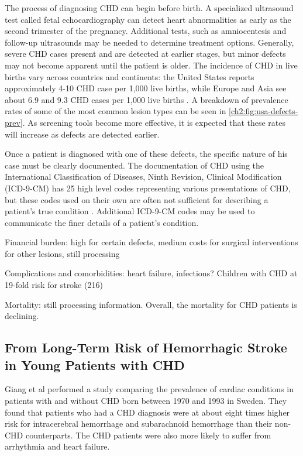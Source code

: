 The process of diagnosing CHD can begin before birth. A specialized ultrasound test called fetal echocardiography can detect heart abnormalities as early as the second trimester of the pregnancy. Additional tests, such as amniocentesis and follow-up ultrasounds may be needed to determine treatment options. Generally, severe CHD cases present and are detected at earlier stages, but minor defects may not become apparent until the patient is older. 
The incidence of CHD in live births vary across countries and continents: the United States reports approximately 4-10 CHD case per 1,000 live births, while Europe and Asia see about 6.9 and 9.3 CHD cases per 1,000 live births \cite{Mozaffarian2016}.
A breakdown of prevalence rates of some of the most common lesion types can be seen in \ref{ch2:fig:usa-defects-prev}.
As screening tools become more effective, it is expected that these rates will increase as defects are detected earlier. %

Once a patient is diagnosed with one of these defects, the specific nature of his case must be clearly documented. The documentation of CHD using the International Classification of Diseases, Ninth Revision, Clinical Modification (ICD-9-CM) has 25 high level codes representing various presentations of CHD, but these codes used on their own are often not sufficient for describing a patient's true condition \cite{Mozaffarian2016}. Additional ICD-9-CM codes may be used to communicate the finer details of a patient's condition. 


Financial burden: high for certain defects, medium costs for surgical interventions for other lesions, still processing \cite{Mozaffarian2016}

Complications and comorbidities: heart failure, infections? Children with CHD at 19-fold risk for stroke (216) \cite{Mozaffarian2016}

Mortality: still processing information. Overall, the mortality for CHD patients is declining.  \cite{Mozaffarian2016}


\subsection{From Long-Term Risk of Hemorrhagic Stroke in Young Patients with CHD}
Giang et al performed a study comparing the prevalence of cardiac conditions in patients with and without CHD born between 1970 and 1993 in Sweden. They found that patients who had a CHD diagnosis were at about eight times higher risk for intracerebral hemorrhage and subarachnoid hemorrhage than their non-CHD counterparts. The CHD patients were also more likely to suffer from arrhythmia and heart failure.

